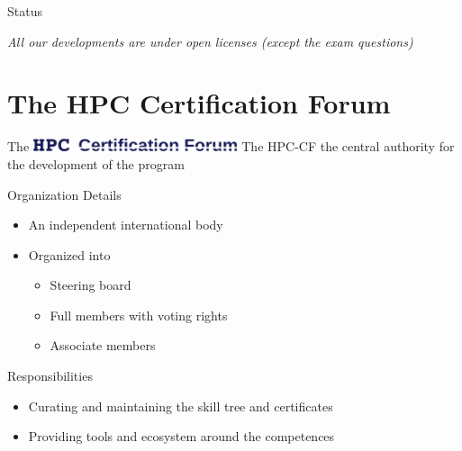 \documentclass[compress,aspectratio=169]{beamer}
\begin{document}
\begin{frame}{Status}
\medskip

\textit{All our developments are under open licenses (except the exam questions)}
\end{frame}




\section{The HPC Certification Forum}
\sectionIntroHidden

\begin{frame}{The \includegraphics[width=0.45\textwidth]{hpccf-full}}
	The HPC-CF the central authority for the development of the program

	\begin{block}{Organization Details}
		\begin{itemize}
			\item An independent international body
			\item Organized into
				\begin{itemize}
					\item Steering board
					\item Full members with voting rights
					\item Associate members
				\end{itemize}
		\end{itemize}
	\end{block}

	\begin{block}{Responsibilities}
		\begin{itemize}
			\item Curating and maintaining the skill tree and certificates
			\item Providing tools and ecosystem around the competences
		\end{itemize}
	\end{block}
\end{frame}
\end{document}
